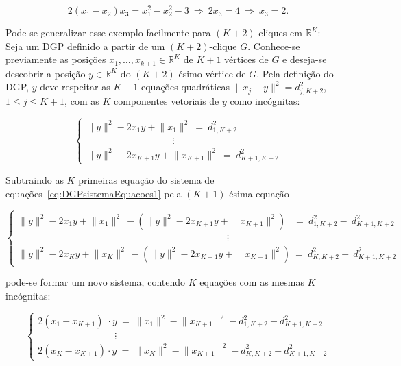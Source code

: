 \begin{equation*}
	2(x_1-x_2)x_3 = x_1^2 - x_2^2 - 3 \ \Rightarrow \ 2x_3 = 4 \ \Rightarrow \ x_3 = 2.
\end{equation*}

Pode-se generalizar esse exemplo facilmente para $(K+2)$-cliques em $\mathbb{R}^{K}$:
\\

Seja um DGP definido a partir de um $(K+2)$-clique $G$. Conhece-se previamente as posições $x_1, \dots, x_{k+1} \in \mathbb{R}^{K}$ de $K+1$ vértices de $G$ e deseja-se descobrir a posição $y\in\mathbb{R}^K$ do $(K+2)$-ésimo vértice de $G$. Pela definição do DGP, $y$ deve respeitar as $K+1$ equações quadráticas $\lVert x_j-y\rVert^2 = d_{j,K+2}^2$, $1\leq j\leq K+1$, com as $K$ componentes vetoriais de $y$ como incógnitas:

\begin{equation}
	\begin{cases} 
		\lVert y \rVert^2 -2x_1y + \lVert x_1\rVert^2 \ = \ d^2_{1,K+2}
		\\
		\qquad\qquad\qquad\quad\qquad \!\vdots
		\\
		\lVert y \rVert^2 -2x_{K+1}y + \lVert x_{K+1}\rVert^2 \ = \ d^2_{K+1,K+2}
	\end{cases}
	\label{eq:DGPsistemaEquacoes1}
\end{equation}

Subtraindo as $K$ primeiras equação do sistema de equações~\ref{eq:DGPsistemaEquacoes1} pela $(K+1)$-ésima equação

\begin{equation}
\begin{cases} 
\lVert y \rVert^2 -2x_1y + \lVert x_1\rVert^2 \ - (\lVert y \rVert^2 -2x_{K+1}y + \lVert x_{K+1}\rVert^2 )\; \; \ = \ d^2_{1,K+2} - \ d^2_{K+1,K+2}
\\
\qquad\qquad\qquad\quad\qquad\qquad\qquad\qquad\qquad\quad\qquad\quad \ \; \;\vdots
\\
\lVert y \rVert^2 -2x_Ky + \lVert x_K\rVert^2 \ - (\lVert y \rVert^2 -2x_{K+1}y + \lVert x_{K+1}\rVert^2 )\ = \ d^2_{K,K+2} - \ d^2_{K+1,K+2}
\end{cases}
\label{eq:DGPsistemaEquacoes3}
\end{equation}

pode-se formar um novo sistema, contendo $K$ equações com as mesmas $K$ incógnitas:

\begin{equation}
\begin{cases} 
2(x_1-x_{K+1}) \;\cdot y \ = \ \lVert x_1\rVert^2 - \lVert x_{K+1}\rVert^2 - d^2_{1,K+2} + d^2_{K+1,K+2} 
\\
\qquad\qquad\qquad\qquad\!\!\!\vdots
\\
2(x_{K}-x_{K+1}) \cdot y \ = \ \lVert x_{K}\rVert^2 - \lVert x_{K+1}\rVert^2 - d^2_{K,K+2} + d^2_{K+1,K+2} 
\end{cases}
\label{eq:DGPsistemaEquacoes2}
\end{equation}

